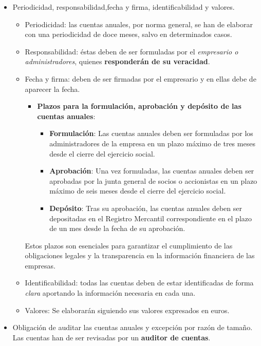 \documentclass[
  paper=a4,
  ,captions=tableheading
]{scrbook}
\providecommand{\tightlist}{%
  \setlength{\itemsep}{0pt}\setlength{\parskip}{0pt}}
\begin{document}
\begin{itemize}
\tightlist
\item
  Periodicidad, responsabilidad,fecha y firma, identificabilidad y
  valores.

  \begin{itemize}
  \tightlist
  \item
    Periodicidad: las cuentas anuales, por norma general, se han de
    elaborar con una periodicidad de doce meses, salvo en determinados
    casos.
  \item
    Responsabilidad: éstas deben de ser formuladas por el
    \emph{empresario o administradores}, quienes \textbf{responderán de
    su veracidad}.
  \item
    Fecha y firma: deben de ser firmadas por el empresario y en ellas
    debe de aparecer la fecha.

    \begin{itemize}
    \tightlist
    \item
      \textbf{Plazos para la formulación, aprobación y depósito de las
      cuentas anuales}:

      \begin{itemize}
      \tightlist
      \item
        \textbf{Formulación}: Las cuentas anuales deben ser formuladas
        por los administradores de la empresa en un plazo máximo de tres
        meses desde el cierre del ejercicio social.
      \item
        \textbf{Aprobación}: Una vez formuladas, las cuentas anuales
        deben ser aprobadas por la junta general de socios o accionistas
        en un plazo máximo de seis meses desde el cierre del ejercicio
        social.
      \item
        \textbf{Depósito}: Tras su aprobación, las cuentas anuales deben
        ser depositadas en el Registro Mercantil correspondiente en el
        plazo de un mes desde la fecha de su aprobación.
      \end{itemize}
    \end{itemize}

    Estos plazos son esenciales para garantizar el cumplimiento de las
    obligaciones legales y la transparencia en la información financiera
    de las empresas.
  \item
    Identificabilidad: todas las cuentas deben de estar identificadas de
    forma \emph{clara} aportando la información necesaria en cada una.
  \item
    Valores: Se elaborarán siguiendo sus valores expresados en euros.
  \end{itemize}
\item
  Obligación de auditar las cuentas anuales y excepción por razón de
  tamaño. Las cuentas han de ser revisadas por un \textbf{auditor de
  cuentas}.


\end{itemize}
\end{document}
